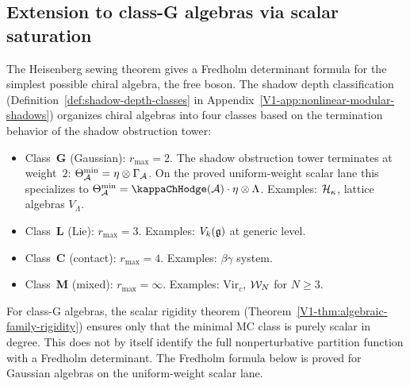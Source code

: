 %
%

\subsection{Extension to class-G algebras via scalar saturation}

The Heisenberg sewing theorem gives a Fredholm determinant
formula for the simplest possible chiral algebra, the free boson.
The shadow depth classification
(Definition~\ref{def:shadow-depth-classes}
in Appendix~\ref*{V1-app:nonlinear-modular-shadows})
organizes chiral algebras into four classes based on the
termination behavior of the shadow obstruction tower:
\begin{itemize}
\item Class~\textbf{G} (Gaussian): $r_{\max} = 2$.
 The shadow obstruction tower terminates at weight~$2$:
 $\Theta_{\mathcal{A}}^{\min} = \eta\otimes\Gamma_{\mathcal{A}}$.
 On the proved uniform-weight scalar lane this specializes to
 $\Theta_\cA^{\min} = \kappaChHodge(\cA)\cdot\eta \otimes \Lambda$.
 Examples: $\mathcal{H}_\kappa$, lattice algebras $V_\Lambda$.
\item Class~\textbf{L} (Lie): $r_{\max} = 3$.
 Examples: $V_k(\mathfrak{g})$ at generic level.
\item Class~\textbf{C} (contact): $r_{\max} = 4$.
 Examples: $\beta\gamma$ system.
\item Class~\textbf{M} (mixed): $r_{\max} = \infty$.
 Examples: $\mathrm{Vir}_c$, $\mathcal{W}_N$ for $N \geq 3$.
\end{itemize}
For class-G algebras, the scalar rigidity theorem
(Theorem~\ref{V1-thm:algebraic-family-rigidity}) ensures only that the
minimal MC class is purely scalar in degree. This does not by itself
identify the full nonperturbative partition function with a Fredholm
determinant. The Fredholm formula below is proved for Gaussian
algebras on the uniform-weight scalar lane.

